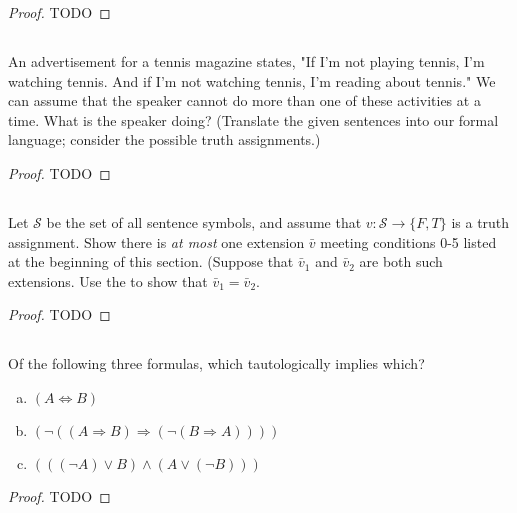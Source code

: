 \documentclass{report}
\begin{document}
  \begin{proof}
    TODO
  \end{proof}

\subsection{}%

  An advertisement for a tennis magazine states, "If I'm not playing tennis,
    I'm watching tennis. And if I'm not watching tennis, I'm reading about
    tennis."
  We can assume that the speaker cannot do more than one of these activities at
    a time.
  What is the speaker doing?
  (Translate the given sentences into our formal language; consider the possible
    truth assignments.)

  \begin{proof}
    TODO
  \end{proof}

\subsection{}%

  Let $\mathcal{S}$ be the set of all sentence symbols, and assume that
    $v \colon \mathcal{S} \rightarrow \{F, T\}$ is a truth assignment.
  Show there is \textit{at most} one extension $\bar{v}$ meeting conditions 0-5
    listed at the beginning of this section.
  (Suppose that $\bar{v}_1$ and $\bar{v}_2$ are both such extensions. Use the
     to show that $\bar{v}_1 = \bar{v}_2$.

  \begin{proof}
    TODO
  \end{proof}

\subsection{}%

  Of the following three formulas, which tautologically implies which?
    \begin{enumerate}[(a)]
      \item $(A \Leftrightarrow B)$
      \item $(\neg((A \Rightarrow B) \Rightarrow (\neg(B \Rightarrow A))))$
      \item $(((\neg A) \lor B) \land (A \lor (\neg B)))$
    \end{enumerate}

  \begin{proof}
    TODO
  \end{proof}
\end{document}
